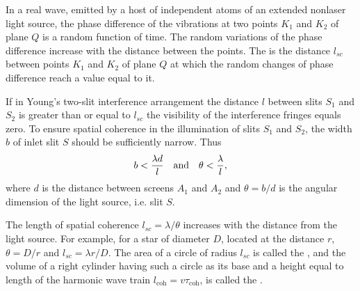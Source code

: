 In a real wave, emitted by a host of independent atoms of an
extended nonlaser light source, the phase difference of the
vibrations at two points $K_{1}$ and $K_{2}$ of plane $Q$ is a random function of time. The random variations of the phase difference increase with the distance between the points. The  is the distance $l_{sc}$ between points $K_{1}$ and $K_{2}$ of plane $Q$ at which the random changes of phase difference reach a value equal to it. 

If in Young's two-slit interference arrangement the distance $l$ between slits $S_{1}$ and $S_{2}$ is greater than or equal to $l_{sc}$ the visibility of the interference fringes equals zero. To ensure spatial coherence in the illumination of slits $S_{1}$ and $S_{2}$, the width $b$ of inlet slit $S$ should be sufficiently narrow. Thus
\begin{equation*}%
b < \frac{\lambda d}{l} \qand \theta < \frac{\lambda}{l},
\end{equation*}
where $d$ is the distance between screens $A_{1}$ and $A_{2}$ and $\theta = b/d$ is the angular dimension of the light source, i.e. slit $S$.

The length of spatial coherence $l_{sc} = \lambda/\theta$ increases with the distance from the light source. For example, for a star of diameter $D$, located at the distance $r$, $\theta = D/r$ and $l_{sc} = \lambda r/D$. The area of a circle of radius $l_{sc}$ is called the , and the volume of a right cylinder having such a circle as its base and a height equal to length of the harmonic wave train  $l_{\text{coh}} = v \tau_{\text{coh}}$, is called the .


